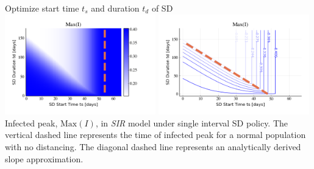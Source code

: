 \documentclass[10pt]{beamer}
\begin{document}
\begin{frame}{Optimize start time $t_s$ and duration $t_d$ of SD}
	\includegraphics[width=0.49\textwidth]{epidemic-sir-heatmap.png}
	\includegraphics[width=0.49\textwidth]{epidemic-sir-contour.png} \\ \vspace{0.5cm}
	Infected peak, $\mbox{Max}(I)$, in \textit{SIR} model under single interval SD policy. The vertical dashed line represents the time of infected peak for a normal population with no distancing. The diagonal dashed line represents an analytically derived slope approximation.
\end{frame}
\end{document}
